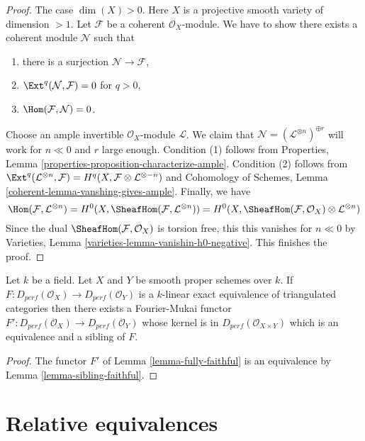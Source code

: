 \begin{proof}
\medskip\noindent
The case $\dim(X) > 0$. Here $X$ is a projective smooth
variety of dimension $> 1$. Let $\mathcal{F}$ be a coherent
$\mathcal{O}_X$-module. We have to show there exists a
coherent module $\mathcal{N}$ such that
\begin{enumerate}
\item there is a surjection $\mathcal{N} \to \mathcal{F}$,
\item $\Ext^q(\mathcal{N}, \mathcal{F}) = 0$ for $q > 0$,
\item $\Hom(\mathcal{F}, \mathcal{N}) = 0$.
\end{enumerate}
Choose an ample invertible $\mathcal{O}_X$-module $\mathcal{L}$.
We claim that $\mathcal{N} = (\mathcal{L}^{\otimes n})^{\oplus r}$
will work for $n \ll 0$ and $r$ large enough.
Condition (1) follows from
Properties, Lemma \ref{properties-proposition-characterize-ample}.
Condition (2) follows from
$\Ext^q(\mathcal{L}^{\otimes n}, \mathcal{F}) =
H^q(X, \mathcal{F} \otimes \mathcal{L}^{\otimes -n})$ and
Cohomology of Schemes, Lemma \ref{coherent-lemma-vanshing-gives-ample}.
Finally, we have
$$
\Hom(\mathcal{F}, \mathcal{L}^{\otimes n}) =
H^0(X, \SheafHom(\mathcal{F}, \mathcal{L}^{\otimes n})) =
H^0(X, \SheafHom(\mathcal{F}, \mathcal{O}_X) \otimes \mathcal{L}^{\otimes n})
$$
Since the dual $\SheafHom(\mathcal{F}, \mathcal{O}_X)$ is torsion free, this
this vanishes for $n \ll 0$ by Varieties, Lemma 
\ref{varieties-lemma-vanishin-h0-negative}. This finishes the proof.
\end{proof}

\begin{proposition}
\label{proposition-equivalence}
Let $k$ be a field. Let $X$ and $Y$ be smooth proper schemes over $k$.
If $F : D_{perf}(\mathcal{O}_X) \to D_{perf}(\mathcal{O}_Y)$
is a $k$-linear exact equivalence of triangulated categories then
there exists a Fourier-Mukai functor
$F' : D_{perf}(\mathcal{O}_X) \to D_{perf}(\mathcal{O}_Y)$ whose
kernel is in $D_{perf}(\mathcal{O}_{X \times Y})$
which is an equivalence and a sibling of $F$.
\end{proposition}

\begin{proof}
The functor $F'$ of Lemma \ref{lemma-fully-faithful}
is an equivalence by Lemma \ref{lemma-sibling-faithful}.
\end{proof}





\section{Relative equivalences}
\label{section-relative-equivalences}

